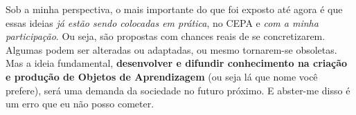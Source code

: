 Sob a minha perspectiva, o mais importante do que foi exposto até agora é que essas ideias \emph{já estão sendo colocadas em prática}, no CEPA e \emph{com a minha participação}. Ou seja, são propostas com chances reais de se concretizarem. Algumas podem ser alteradas ou adaptadas, ou mesmo tornarem-se obsoletas. Mas a ideia fundamental, {\bfseries desenvolver e difundir conhecimento na criação e produção de Objetos de Aprendizagem} (ou seja lá que nome você prefere), será uma demanda da sociedade no futuro próximo. E abster-me disso é um erro que eu não posso cometer.

